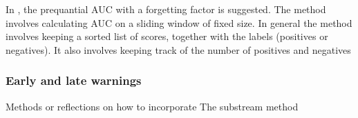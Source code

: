 In \cite{Brz14}, the prequantial AUC with a forgetting factor is suggested.  The method involves calculating AUC on a sliding window of fixed size.  In general the method involves keeping a sorted list of scores, together with the labels (positives or negatives).  It also involves keeping track of the number of positives and negatives   



\subsubsection{Early and late warnings}
Methods or reflections on how to incorporate
The substream method

%
%
%
%





 

%
